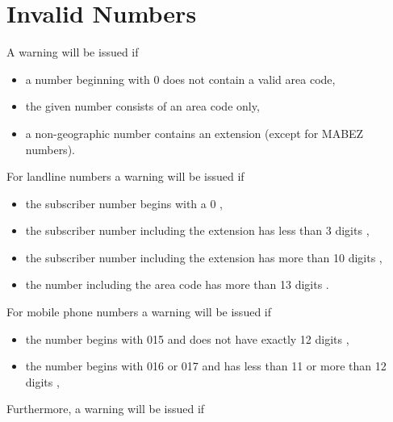\documentclass[numbers=noenddot]{scrreprt}
\newcommand{\UeberschriftUngueltig}{\section{Invalid Numbers}}
\newcommand{\WarnungWenn}{A warning will be issued if}
\begin{document}
\UeberschriftUngueltig
\WarnungWenn
\begin{itemize}
\item a number beginning with 0 does not contain a valid area code,
\item the given number consists of an area code only,
\item a non-geographic number contains an extension (except for MABEZ numbers).
\end{itemize}
For landline numbers a warning will be issued if
\begin{itemize}
\item the subscriber number begins with a 0 \cite[6]{BNA-nummernplan},
\item the subscriber number including the extension has less than 3 digits \cite[6]{BNA-nummernplan},
\item the subscriber number including the extension has more than 10 digits \cite[2]{BNA-Struktur},
\item the number including the area code has more than 13 digits \cite[2]{BNA-Struktur}.
\end{itemize}
For mobile phone numbers a warning will be issued if
\begin{itemize}
\item the number begins with 015 and does not have exactly 12 digits \cite[49\psq]{BNA-konzept},
\item the number begins with 016 or 017 and has less than 11 or more than 12 digits \cite[50]{BNA-konzept},
\end{itemize}
Furthermore, a warning will be issued if
\end{document}
